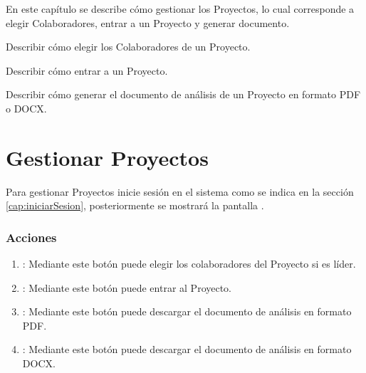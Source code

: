 
En este capítulo se describe cómo gestionar los Proyectos, lo cual corresponde a elegir Colaboradores, entrar a un Proyecto y generar documento.\\


\begin{objetivos}
	\item Describir cómo elegir los Colaboradores de un Proyecto.
	\item Describir cómo entrar a un Proyecto.
	\item Describir cómo generar el documento de análisis de un Proyecto en formato PDF o DOCX.
\end{objetivos}



\section{Gestionar Proyectos}

Para gestionar Proyectos inicie sesión en el sistema como se indica en la sección \ref{cap:iniciarSesion}, posteriormente se mostrará la pantalla . 


\subsubsection{Acciones}

\begin{enumerate}
	\item {}: Mediante este botón puede elegir los colaboradores del Proyecto si es líder.
	\item {}: Mediante este botón puede entrar al Proyecto.
	\item {}: Mediante este botón puede descargar el documento de análisis en formato PDF.
	\item {}: Mediante este botón puede descargar el documento de análisis en formato DOCX.
\end{enumerate}



